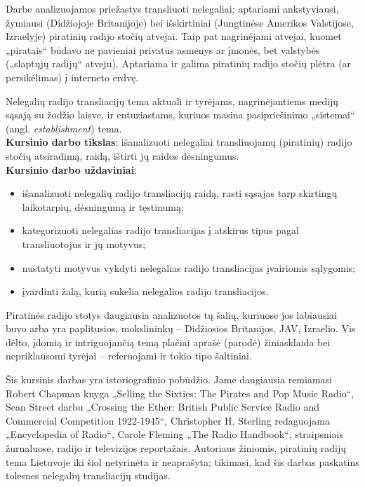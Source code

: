 \documentclass[kursinis-darbas]{vukf}
\begin{document}
Darbe analizuojamos priežastys transliuoti nelegaliai; aptariami ankstyviausi, žymiausi (Didžiojoje Britanijoje) bei išskirtiniai (Jungtinėse Amerikos Valstijose, Izraelyje) piratinių radijo stočių atvejai. Taip pat nagrinėjami atvejai, kuomet „piratais“ būdavo ne pavieniai privatūs asmenys ar įmonės, bet valstybės („slaptųjų radijų“ atveju). Aptariama ir galima piratinių radijo stočių plėtra (ar persikėlimas) į interneto erdvę.

Nelegalių radijo transliacijų tema aktuali ir tyrėjams, nagrinėjantiems medijų sąsają su žodžio laisve, ir entuziastams, kuriuos masina pasipriešinimo „sistemai“ (angl. \emph{establishment}) tema.\\

\textbf{Kursinio darbo tikslas}: išanalizuoti nelegaliai transliuojamų (piratinių) radijo stočių atsiradimą, raidą, ištirti jų raidos dėsningumus.\\

\textbf{Kursinio darbo uždaviniai}:

\begin{itemize}
	\item išanalizuoti nelegalių radijo transliacijų raidą, rasti sąsajas tarp skirtingų laikotarpių, dėsningumą ir tęstinumą;
	\item kategorizuoti nelegalias radijo transliacijas į atskirus tipus pagal transliuotojus ir jų motyvus;
	\item nustatyti motyvus vykdyti nelegalias radijo transliacijas įvairiomis sąlygomis;
	\item įvardinti žalą, kurią sukelia nelegalios radijo transliacijos.
\end{itemize}

Piratinės radijo stotys daugiausia analizuotos tų šalių, kuriuose jos labiausiai buvo arba yra paplitusios, mokslininkų – Didžiosios Britanijos, JAV, Izraelio. Vis dėlto, įdomią ir intriguojančią temą plačiai aprašė (parodė) žiniasklaida bei nepriklausomi tyrėjai – referuojami ir tokio tipo šaltiniai.

Šis kursinis darbas yra istoriografinio pobūdžio. Jame daugiausia remiamasi Robert Chapman knyga „Selling the Sixties: The Pirates and Pop Music Radio“, Sean Street darbu „Crossing the Ether: British Public Service Radio and Commercial Competition 1922-1945“, Christopher H. Sterling redaguojama „Encyclopedia of Radio“, Carole Fleming „The Radio Handbook“, straipsniais žurnaluose, radijo ir televizijos reportažais. Autoriaus žiniomis, piratinių radijų tema Lietuvoje iki šiol netyrinėta ir neaprašyta; tikimasi, kad šis darbas paskatins tolesnes nelegalių transliacijų studijas.
\end{document}
